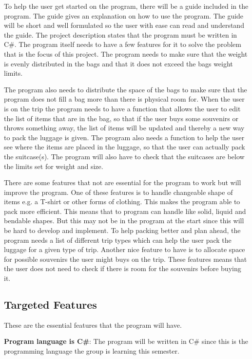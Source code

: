 To help the user get started on the program, there will be a guide included in the program. The guide gives an explanation on how to use the program. The guide will be short and well formulated so the user with ease can read and understand the guide.
The project description states that the program must be written in C\#.
The program itself needs to have a few features for it to solve the problem that is the focus of this project. The program needs to make sure that the weight is evenly distributed in the bags and that it does not exceed the bags weight limits. 

The program also needs to distribute the space of the bags to make sure that the program does not fill a bag more than there is physical room for.
When the user is on the trip the program needs to have a function that allows the user to edit the list of items that are in the bag, so that if the user buys some souvenirs or throws something away, the list of items will be updated and thereby a new way to pack the luggage is given.
The program also needs a function to help the user see where the items are placed in the luggage, so that the user can actually pack the suitcase(s).
The program will also have to check that the suitcases are below the limits set for weight and size.

There are some features that not are essential for the program to work but will improve the program. One of these features is to handle changeable shape of items e.g. a T-shirt or other forms of clothing. This makes the program able to pack more efficient. This means that to program can handle like solid, liquid and bendable shapes. But this may not be in the program at the start since this will be hard to develop and implement.
To help packing better and plan ahead, the program needs a list of different trip types which can help the user pack the luggage for a given type of trip.
Another nice feature to have is to allocate space for possible souvenirs the user might buys on the trip. These features means that the user does not need to check if there is room for the souvenirs before buying it.

\subsection{Targeted Features}
These are the essential features that the program will have.\newline

\textbf{Program language is C\#}:
The program will be written in C\# since this is the programming language the group is learning this semester.
\newline

